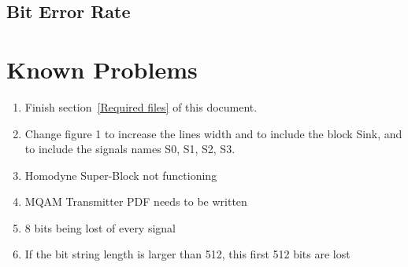 \documentclass[a4paper]{article}
\begin{document}
\subsection{Bit Error Rate}


\section{Known Problems}
\begin{enumerate}
    \item{Finish section~\ref{Required files} of this document.}
    \item{Change figure 1 to increase the lines width and to include the block Sink, and to include the signals names S0, S1, S2, S3.}
    \item Homodyne Super-Block not functioning
    \item MQAM Transmitter PDF needs to be written
    \item 8 bits being lost of every signal
    \item If the bit string length is larger than 512, this first 512 bits are lost
\end{enumerate}
\end{document}

